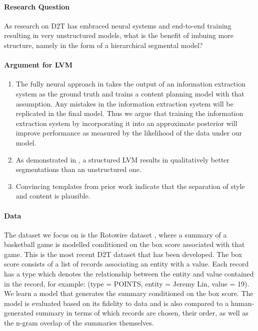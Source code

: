 \documentclass[11pt]{article}
\begin{document}
\paragraph{Research Question}
As research on D2T has embraced neural systems and end-to-end training resulting
in very unstructured models, what is the benefit of imbuing more structure, namely in the
form of a hierarchical segmental model?

\paragraph{Argument for LVM}
\begin{enumerate}
\item The fully neural approach in \citep{puduppully2018contentselection} takes the output of
an information extraction system as the ground truth and trains a content planning model with
that assumption.
Any mistakes in the information extraction system will be replicated in the final model.
Thus we argue that training the information extraction system by incorporating it
into an approximate posterior will improve performance as measured by
the likelihood of the data under our model.
\item As demonstrated in \citep{liang2009semalign},
a structured LVM results in qualitatively better segmentations than an unstructured one.
\item Convincing templates from prior work \citep{wiseman2018template} indicate that the separation of
style and content is plausible.
\end{enumerate}

\paragraph{Data}
The dataset we focus on is the Rotowire dataset \citep{wiseman2017d2t},
where a summary of a basketball game is modelled conditioned on the box score
associated with that game.
This is the most recent D2T dataset that has been developed.
The box score consists of a list of records associating an entity with a value.
Each record has a type which denotes the relationship between the entity and value
contained in the record,
for example: (type = POINTS, entity = Jeremy Lin, value = 19).
We learn a model that generates the summary conditioned on the box score.
The model is evaluated based on its fidelity to data and
is also compared to a human-generated summary in terms of which records are chosen,
their order, as well as the n-gram overlap of the summaries themselves.
\end{document}
